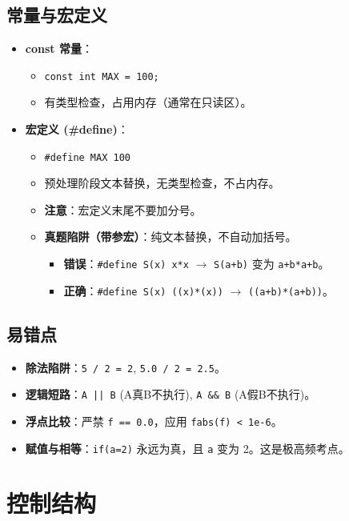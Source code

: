 \documentclass[a4paper,12pt]{article}
\begin{document}
\subsection{常量与宏定义}
\begin{itemize}
    \item \textbf{const 常量}：
    \begin{itemize}
        \item \texttt{const int MAX = 100;}
        \item 有类型检查，占用内存（通常在只读区）。
    \end{itemize}
    \item \textbf{宏定义 (\#define)}：
    \begin{itemize}
        \item \texttt{\#define MAX 100}
        \item 预处理阶段文本替换，无类型检查，不占内存。
        \item \textbf{注意}：宏定义末尾不要加分号。
        \item \textbf{真题陷阱（带参宏）}：纯文本替换，不自动加括号。
        \begin{itemize}
            \item \textbf{错误}：\texttt{\#define S(x) x*x} $\rightarrow$ \texttt{S(a+b)} 变为 \texttt{a+b*a+b}。
            \item \textbf{正确}：\texttt{\#define S(x) ((x)*(x))} $\rightarrow$ \texttt{((a+b)*(a+b))}。
        \end{itemize}
    \end{itemize}
\end{itemize}

\subsection{易错点}
\begin{itemize}
    \item \textbf{除法陷阱}：\texttt{5 / 2 = 2}, \texttt{5.0 / 2 = 2.5}。
    \item \textbf{逻辑短路}：\texttt{A || B} (A真B不执行), \texttt{A \&\& B} (A假B不执行)。
    \item \textbf{浮点比较}：严禁 \texttt{f == 0.0}，应用 \texttt{fabs(f) < 1e-6}。
    \item \textbf{赋值与相等}：\texttt{if(a=2)} 永远为真，且 \texttt{a} 变为 2。这是极高频考点。
\end{itemize}

\section{控制结构}
\label{sec:control_structures}
\end{document}
